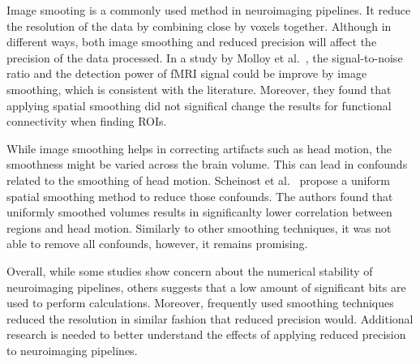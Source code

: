 Image smooting is a commonly used method in neuroimaging pipelines.
It reduce the resolution of the data by combining close by voxels together.
Although in different ways, both image smoothing and reduced precision will affect
the precision of the data processed.
In a study by Molloy et al.~\cite{Molloy2014-oc}, the signal-to-noise ratio and the detection power
of fMRI signal could be improve by image smoothing, which is consistent with the literature.
Moreover, they found that applying spatial smoothing did not significal change the
results for functional connectivity when finding ROIs.

While image smoothing helps in correcting artifacts such as head motion, the smoothness
might be varied across the brain volume.
This can lead in confounds related to the smoothing of head motion.
Scheinost et al.~\cite{Scheinost2014-ds} propose a uniform spatial smoothing method
to reduce those confounds.
The authors found that uniformly smoothed volumes results in significanlty lower
correlation between regions and head motion.
Similarly to other smoothing techniques, it was not able to remove all confounds, however,
it remains promising.

Overall, while some studies show concern about the numerical stability of neuroimaging
pipelines, others suggests that a low amount of significant bits are used to perform calculations.
Moreover, frequently used smoothing techniques reduced the resolution in similar fashion
that reduced precision would.
Additional research is needed to better understand the effects of applying reduced
precision to neuroimaging pipelines.
